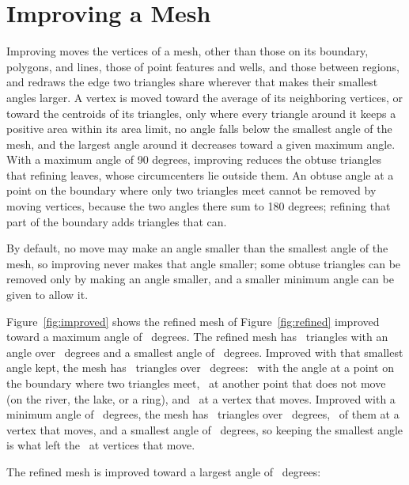 \documentclass[11pt,twoside,twocolumn]{usgsreport}
\newcommand{\codelead}{\par\vskip 0pt plus 7\baselineskip\penalty -250\vskip 0pt plus -7\baselineskip}
\newcommand{\excerpt}[2]{\VerbatimInput[fontsize=\small,numbers=left,numbersep=6pt,firstnumber=\csname excerpt#1first\endcsname,firstline=\csname excerpt#1first\endcsname,lastline=\csname excerpt#1last\endcsname]{#2}}
\begin{document}
\section{Improving a Mesh}

Improving moves the vertices of a mesh, other than those on its boundary, polygons, and lines, those of point features and wells, and those between regions, and redraws the edge two triangles share wherever that makes their smallest angles larger. A vertex is moved toward the average of its neighboring vertices, or toward the centroids of its triangles, only where every triangle around it keeps a positive area within its area limit, no angle falls below the smallest angle of the mesh, and the largest angle around it decreases toward a given maximum angle. With a maximum angle of 90 degrees, improving reduces the obtuse triangles that refining leaves, whose circumcenters lie outside them. An obtuse angle at a point on the boundary where only two triangles meet cannot be removed by moving vertices, because the two angles there sum to 180 degrees; refining that part of the boundary adds triangles that can.

By default, no move may make an angle smaller than the smallest angle of the mesh, so improving never makes that angle smaller; some obtuse triangles can be removed only by making an angle smaller, and a smaller minimum angle can be given to allow it.

Figure~\ref{fig:improved} shows the refined mesh of Figure~\ref{fig:refined} improved toward a maximum angle of \improveangle\ degrees. The refined mesh has \ triangles with an angle over \improveangle\ degrees and a smallest angle of \ degrees. Improved with that smallest angle kept, the mesh has \improvedoverninety\ triangles over \improveangle\ degrees: \improvedboundaryover\ with the angle at a point on the boundary where two triangles meet, \improvedfixedover\ at another point that does not move (on the river, the lake, or a ring), and \improvedfreeover\ at a vertex that moves. Improved with a minimum angle of \tradedangle\ degrees, the mesh has \tradedoverninety\ triangles over \improveangle\ degrees, \tradedfreeover\ of them at a vertex that moves, and a smallest angle of \tradedsmallest\ degrees, so keeping the smallest angle is what left the \improvedfreeover\ at vertices that move.

\codelead
The refined mesh is improved toward a largest angle of \improveangle\ degrees:

\excerpt{improve}{valley.py}
\end{document}
